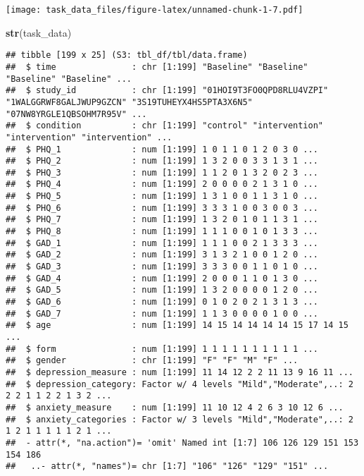 \documentclass[
]{article}
\newenvironment{Shaded}{\begin{snugshade}}{\end{snugshade}}
\newcommand{\FunctionTok}[1]{\textcolor[rgb]{0.13,0.29,0.53}{\textbf{#1}}}
\newcommand{\NormalTok}[1]{#1}
\begin{document}
\texttt{[image: task\_data\_files/figure-latex/unnamed-chunk-1-7.pdf]}

\begin{Shaded}
\begin{Highlighting}[]
\FunctionTok{str}\NormalTok{(task\_data)}
\end{Highlighting}
\end{Shaded}

\begin{verbatim}
## tibble [199 x 25] (S3: tbl_df/tbl/data.frame)
##  $ time               : chr [1:199] "Baseline" "Baseline" "Baseline" "Baseline" ...
##  $ study_id           : chr [1:199] "01HOI9T3FO0QPD8RLU4VZPI" "1WALGGRWF8GALJWUP9GZCN" "3S19TUHEYX4HS5PTA3X6N5" "07NW8YRGLE1QBSOHM7R95V" ...
##  $ condition          : chr [1:199] "control" "intervention" "intervention" "intervention" ...
##  $ PHQ_1              : num [1:199] 1 0 1 1 0 1 2 0 3 0 ...
##  $ PHQ_2              : num [1:199] 1 3 2 0 0 3 3 1 3 1 ...
##  $ PHQ_3              : num [1:199] 1 1 2 0 1 3 2 0 2 3 ...
##  $ PHQ_4              : num [1:199] 2 0 0 0 0 2 1 3 1 0 ...
##  $ PHQ_5              : num [1:199] 1 3 1 0 0 1 1 3 1 0 ...
##  $ PHQ_6              : num [1:199] 3 3 3 1 0 0 3 0 0 3 ...
##  $ PHQ_7              : num [1:199] 1 3 2 0 1 0 1 1 3 1 ...
##  $ PHQ_8              : num [1:199] 1 1 1 0 0 1 0 1 3 3 ...
##  $ GAD_1              : num [1:199] 1 1 1 0 0 2 1 3 3 3 ...
##  $ GAD_2              : num [1:199] 3 1 3 2 1 0 0 1 2 0 ...
##  $ GAD_3              : num [1:199] 3 3 3 0 0 1 1 0 1 0 ...
##  $ GAD_4              : num [1:199] 2 0 0 0 1 1 0 1 3 0 ...
##  $ GAD_5              : num [1:199] 1 3 2 0 0 0 0 1 2 0 ...
##  $ GAD_6              : num [1:199] 0 1 0 2 0 2 1 3 1 3 ...
##  $ GAD_7              : num [1:199] 1 1 3 0 0 0 0 1 0 0 ...
##  $ age                : num [1:199] 14 15 14 14 14 14 15 17 14 15 ...
##  $ form               : num [1:199] 1 1 1 1 1 1 1 1 1 1 ...
##  $ gender             : chr [1:199] "F" "F" "M" "F" ...
##  $ depression_measure : num [1:199] 11 14 12 2 2 11 13 9 16 11 ...
##  $ depression_category: Factor w/ 4 levels "Mild","Moderate",..: 2 2 2 1 1 2 2 1 3 2 ...
##  $ anxiety_measure    : num [1:199] 11 10 12 4 2 6 3 10 12 6 ...
##  $ anxiety_categories : Factor w/ 3 levels "Mild","Moderate",..: 2 1 2 1 1 1 1 1 2 1 ...
##  - attr(*, "na.action")= 'omit' Named int [1:7] 106 126 129 151 153 154 186
##   ..- attr(*, "names")= chr [1:7] "106" "126" "129" "151" ...
\end{verbatim}
\end{document}
